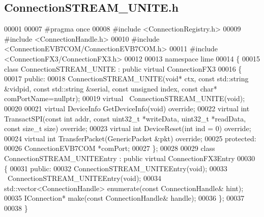 \subsection{Connection\+S\+T\+R\+E\+A\+M\+\_\+\+U\+N\+I\+T\+E.\+h}
\label{ConnectionSTREAM__UNITE_8h_source}

\begin{DoxyCode}
00001 
00007 \textcolor{preprocessor}{#pragma once}
00008 \textcolor{preprocessor}{#include <ConnectionRegistry.h>}
00009 \textcolor{preprocessor}{#include <ConnectionHandle.h>}
00010 \textcolor{preprocessor}{#include <ConnectionEVB7COM/ConnectionEVB7COM.h>}
00011 \textcolor{preprocessor}{#include <ConnectionFX3/ConnectionFX3.h>}
00012 
00013 \textcolor{keyword}{namespace }lime
00014 \{
00015 \textcolor{keyword}{class }ConnectionSTREAM_UNITE : \textcolor{keyword}{public} \textcolor{keyword}{virtual} ConnectionFX3
00016 \{
00017 \textcolor{keyword}{public}:
00018     ConnectionSTREAM_UNITE(\textcolor{keywordtype}{void}* ctx, \textcolor{keyword}{const} std::string &vidpid, \textcolor{keyword}{const} std::string &serial, \textcolor{keyword}{const} \textcolor{keywordtype}{unsigned} 
      index, \textcolor{keyword}{const} \textcolor{keywordtype}{char}* comPortName=\textcolor{keyword}{nullptr});
00019     \textcolor{keyword}{virtual} ~ConnectionSTREAM_UNITE(\textcolor{keywordtype}{void});
00020 
00021     \textcolor{keyword}{virtual} DeviceInfo GetDeviceInfo(\textcolor{keywordtype}{void}) \textcolor{keyword}{override};
00022     \textcolor{keyword}{virtual} \textcolor{keywordtype}{int} TransactSPI(\textcolor{keyword}{const} \textcolor{keywordtype}{int} addr, \textcolor{keyword}{const} uint32\_t *writeData, uint32\_t *readData, \textcolor{keyword}{const} \textcolor{keywordtype}{size\_t} 
      size) \textcolor{keyword}{override};
00023     \textcolor{keyword}{virtual} \textcolor{keywordtype}{int} DeviceReset(\textcolor{keywordtype}{int} ind = 0) \textcolor{keyword}{override};
00024     \textcolor{keyword}{virtual} \textcolor{keywordtype}{int} TransferPacket(GenericPacket &pkt) \textcolor{keyword}{override};
00025 \textcolor{keyword}{protected}:
00026     ConnectionEVB7COM *comPort;
00027 \};
00028 
00029 \textcolor{keyword}{class }ConnectionSTREAM_UNITEEntry : \textcolor{keyword}{public} \textcolor{keyword}{virtual} ConnectionFX3Entry
00030 \{
00031 \textcolor{keyword}{public}:
00032     ConnectionSTREAM_UNITEEntry(\textcolor{keywordtype}{void});
00033     ~ConnectionSTREAM_UNITEEntry(\textcolor{keywordtype}{void});
00034     std::vector<ConnectionHandle> enumerate(\textcolor{keyword}{const} ConnectionHandle& hint);
00035     IConnection* make(\textcolor{keyword}{const} ConnectionHandle& handle);
00036 \};
00037 
00038 \}
\end{DoxyCode}
